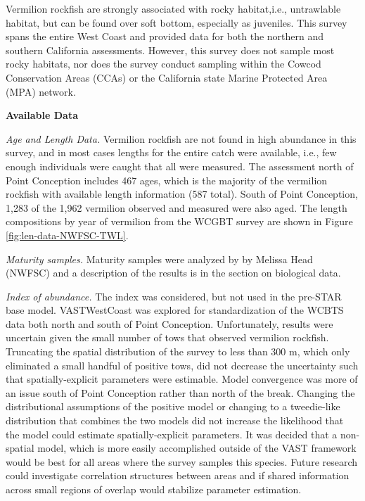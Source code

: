 \documentclass[
  english,
  a4paper,
]{article}
\begin{document}
Vermilion rockfish are strongly associated with rocky
habitat,i.e., untrawlable habitat, but can be found over soft bottom, especially as
juveniles. This survey spans the entire West Coast and provided data for both the
northern and southern California assessments. However, this survey does not sample
most rocky habitats, nor does the survey conduct sampling within the Cowcod
Conservation Areas (CCAs) or the California state Marine Protected Area (MPA) network.

\textbf{Available Data}

\emph{Age and Length Data.} Vermilion rockfish are not found in high abundance in
this survey, and in most cases lengths for the entire catch were available,
i.e., few enough individuals were caught that
all were measured. The assessment north of Point Conception includes 467 ages, which
is the majority of the vermilion rockfish with available length information (587 total).
South of Point Conception, 1,283 of the 1,962 vermilion observed and measured
were also aged. The length compositions by year of vermilion from the WCGBT
survey are shown in Figure \ref{fig:len-data-NWFSC-TWL}.

\emph{Maturity samples.} Maturity samples were analyzed by by Melissa Head (NWFSC) and a
description of the results is in the section on biological data.

\emph{Index of abundance.} The index was considered, but not used in the pre-STAR
base model. VASTWestCoast was explored for standardization of the WCBTS data both
north and south of Point Conception. Unfortunately, results were uncertain given
the small number of tows that observed vermilion rockfish. Truncating the spatial
distribution of the survey to less than 300 m, which only eliminated a small
handful of positive tows, did not decrease the uncertainty such that
spatially-explicit parameters were estimable. Model convergence was more of an
issue south of Point Conception rather than north of the break. Changing the
distributional assumptions of the positive model or changing to a tweedie-like
distribution that combines the two models did not increase the likelihood that
the model could estimate spatially-explicit parameters. It was decided that a
non-spatial model, which is more easily accomplished outside of the VAST
framework would be best for all areas where the survey samples this species.
Future research could investigate correlation structures between areas and if
shared information across small regions of overlap would stabilize parameter estimation.
\end{document}
